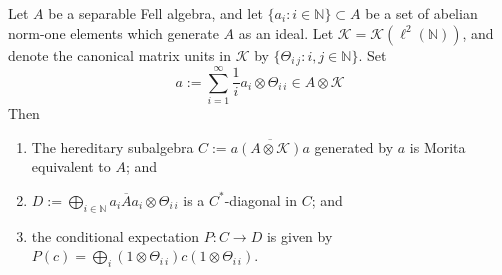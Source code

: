 \documentclass[12pt,a4paper]{amsart}
\newcommand{\field}[1]{\mathbb{#1}}
\newcommand{\NN}{\field{N}}
\newcommand{\Kk}{\mathcal{K}}
\begin{document}
\begin{thm}\label{prp:construct diagonal}
Let $A$ be a separable Fell algebra, and let $\{a_i : i \in
\NN\}\subset A$ be a set of abelian norm-one elements which
generate $A$ as an ideal. Let $\Kk = \Kk(\ell^2(\NN))$, and
denote the canonical matrix units in $\Kk$ by $\{\Theta_{i\,j} :
i,j \in \NN\}$. Set
\[
a:=\sum_{i=1}^\infty \frac{1}{i} a_i \otimes \Theta_{i\,i} \in A \otimes \Kk
\]
Then
\begin{enumerate}
\item  The hereditary subalgebra $C := \overline{a (A
    \otimes \Kk) a}$ generated by $a$
    is Morita equivalent to $A$; and %
\item $D := \bigoplus_{i \in \NN} \overline{a_i A a_i}
    \otimes \Theta_{i\,i}$ is a $C^*$-diagonal in $C$; and
\item the conditional expectation $P:C\to D$ is given by
    $P(c)=\bigoplus_i(1\otimes\Theta_{i\,i})c(1\otimes\Theta_{i\,i})$.
\end{enumerate}
\end{thm}
\end{document}
